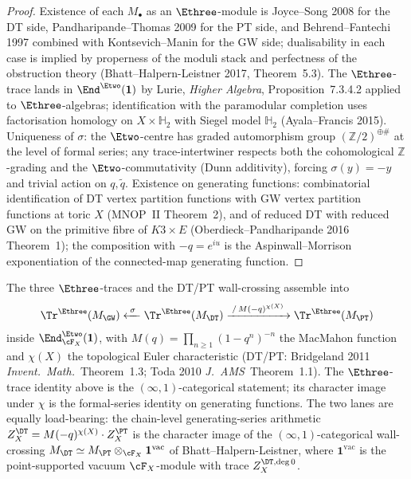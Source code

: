 \begin{proof}
Existence of each $M_\bullet$ as an $\Ethree$-module is Joyce--Song 2008
for the DT side, Pandharipande--Thomas 2009 for the PT side, and
Behrend--Fantechi 1997 combined with Kontsevich--Manin for the GW side;
dualisability in each case is implied by properness of the moduli stack
and perfectness of the obstruction theory (Bhatt--Halpern-Leistner 2017,
Theorem~5.3). The $\Ethree$-trace lands in $\End^{\Etwo}(\mathbf{1})$
by Lurie, \emph{Higher Algebra}, Proposition~7.3.4.2 applied to
$\Ethree$-algebras; identification with the paramodular completion uses
factorisation homology on $X \times \mathbb{H}_2$ with Siegel model
$\mathbb{H}_2$ (Ayala--Francis 2015). Uniqueness of $\sigma$: the
$\Etwo$-centre has graded automorphism group $(\mathbb{Z}/2)^{\oplus\#}$
at the level of formal series; any trace-intertwiner respects both the
cohomological $\mathbb{Z}$-grading and the $\Etwo$-commutativity (Dunn
additivity), forcing $\sigma(y) = -y$ and trivial action on $q, \tilde q$.
Existence on generating functions: combinatorial identification of DT
vertex partition functions with GW vertex partition functions at toric
$X$ (MNOP~II Theorem~2), and of reduced DT with reduced GW on the
primitive fibre of $K3\times E$ (Oberdieck--Pandharipande 2016 Theorem~1);
the composition with $-q = e^{iu}$ is the Aspinwall--Morrison
exponentiation of the connected-map generating function.
\end{proof}

\begin{remark}
\label{rem:three-trace-diagram-mnop}
The three $\Ethree$-traces and the DT/PT wall-crossing assemble into
\[
 \Tr^{\Ethree}(M_{\GW})
 \xleftarrow{\;\sigma\;}
 \Tr^{\Ethree}(M_{\DT})
 \xrightarrow{\;/\, M(-q)^{\chi(X)}\;}
 \Tr^{\Ethree}(M_{\PT})
\]
inside $\End^{\Etwo}_{\cF_X}(\mathbf{1})$, with
$M(q) = \prod_{n\geq 1}(1-q^n)^{-n}$ the MacMahon function and
$\chi(X)$ the topological Euler characteristic (DT/PT: Bridgeland 2011
\emph{Invent.~Math.}~Theorem~1.3; Toda 2010 \emph{J.~AMS}~Theorem~1.1).
The $\Ethree$-trace identity above is the $(\infty,1)$-categorical
statement; its character image under $\chi$ is the formal-series
identity on generating functions. The two lanes are equally load-bearing:
the chain-level generating-series arithmetic $Z^{\DT}_X = M(-q)^{\chi(X)}
\cdot Z^{\PT}_X$ is the character image of the $(\infty,1)$-categorical
wall-crossing $M_{\DT} \simeq M_{\PT}\otimes_{\cF_X}\mathbf{1}^{\mathrm{vac}}$
of Bhatt--Halpern-Leistner, where $\mathbf{1}^{\mathrm{vac}}$ is the
point-supported vacuum $\cF_X$-module with trace $Z^{\DT, \mathrm{deg}\,0}_X$.
\end{remark}

